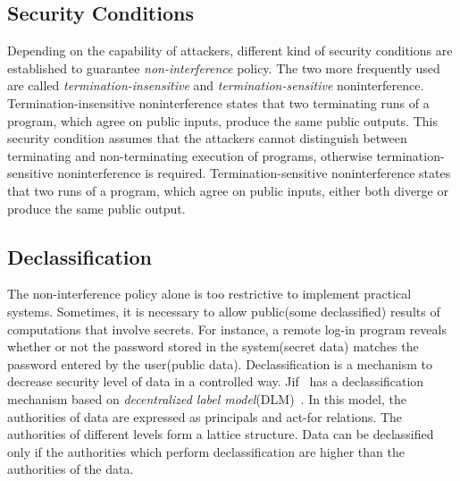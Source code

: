 \documentclass[a4paper]{report}
\begin{document}
\subsection{Security Conditions}
Depending on the capability of attackers, different kind of security conditions
are established to guarantee {\it non-interference} policy.
The two more frequently used are called {\it termination-insensitive} and
{\it termination-sensitive} noninterference.
Termination-insensitive noninterference states that two terminating runs of a program,
which agree on public inputs, produce the same public outputs.
This security condition assumes that the attackers cannot distinguish between
terminating and non-terminating execution of programs, otherwise 
termination-sensitive noninterference is required.
Termination-sensitive noninterference states that two runs of a program, which agree on 
public inputs, either both diverge or produce the same public output.

\subsection{Declassification}
The non-interference policy alone is too restrictive to implement
practical systems. Sometimes, it is necessary to allow public(some declassified) results
of computations that involve secrets. For instance, a remote log-in program 
reveals whether or not the password stored in the system(secret data) matches the
password entered by the user(public data).
Declassification is a mechanism to decrease security
level of data in a controlled way.
Jif~\cite{jif} has a declassification mechanism based on 
{\em decentralized label model}(DLM)~\cite{Myers:Liskov:TSEM2000}.
In this model, the authorities of data are expressed as principals and act-for relations.
The authorities of different levels form a lattice structure.
Data can be declassified only if the authorities which perform declassification
are higher than the authorities of the data.
\end{document}
